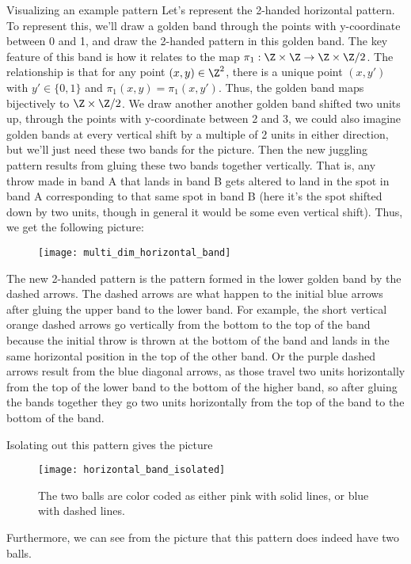 \documentclass[12nt]{article}
\theoremstyle{plain}
\begin{document}
\begin{subsection}{Visualizing an example pattern}
Let's represent the 2-handed horizontal pattern. To represent this, we'll draw a golden band through the points with y-coordinate between 0 and 1, and draw the 2-handed pattern in this golden band. The key feature of this band is how it relates to the map $\pi_1 : \Z \times \Z \to \Z \times \Z/2$. The relationship is that for any point $(x, y) \in \Z^2$, there is a unique point $(x, y')$ with $y' \in \{0, 1\}$ and $\pi_1(x, y) = \pi_1(x, y')$. Thus, the golden band maps bijectively to $\Z \times \Z/2$. We draw another another golden band shifted two units up, through the points with y-coordinate between 2 and 3, we could also imagine golden bands at every vertical shift by a multiple of 2 units in either direction, but we'll just need these two bands for the picture. Then the new juggling pattern results from gluing these two bands together vertically. That is, any throw made in band A that lands in band B gets altered to land in the spot in band A corresponding to that same spot in band B (here it's the spot shifted down by two units, though in general it would be some even vertical shift). Thus, we get the following picture:

\begin{figure}[h]
\texttt{[image: multi\_dim\_horizontal\_band]}
\end{figure}

The new 2-handed pattern is the pattern formed in the lower golden band by the dashed arrows. The dashed arrows are what happen to the initial blue arrows after gluing the upper band to the lower band. For example, the short vertical orange dashed arrows go vertically from the bottom to the top of the band because the initial throw is thrown at the bottom of the band and lands in the same horizontal position in the top of the other band. Or the purple dashed arrows result from the blue diagonal arrows, as those travel two units horizontally from the top of the lower band to the bottom of the higher band, so after gluing the bands together they go two units horizontally from the top of the band to the bottom of the band. 

Isolating out this pattern gives the picture

\begin{figure}[h]
\texttt{[image: horizontal\_band\_isolated]}
\caption{The two balls are color coded as either pink with solid lines, or blue with dashed lines.}
\end{figure}

Furthermore, we can see from the picture that this pattern does indeed have two balls.


\end{subsection}
\end{document}
